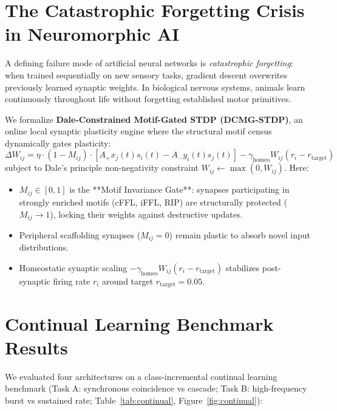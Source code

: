 \documentclass[11pt,letterpaper]{report}
\begin{document}
\section{The Catastrophic Forgetting Crisis in Neuromorphic AI}
A defining failure mode of artificial neural networks is \textit{catastrophic forgetting}: when trained sequentially on new sensory tasks, gradient descent overwrites previously learned synaptic weights. In biological nervous systems, animals learn continuously throughout life without forgetting established motor primitives.

We formalize \textbf{Dale-Constrained Motif-Gated STDP (DCMG-STDP)}, an online local synaptic plasticity engine where the structural motif census dynamically gates plasticity:
\begin{equation}
\Delta W_{ij} = \eta \cdot (1 - M_{ij}) \cdot \left[ A_+ x_j(t) s_i(t) - A_- y_i(t) s_j(t) \right] - \gamma_{\mathrm{homeo}} W_{ij} (r_i - r_{\mathrm{target}})
\end{equation}
subject to Dale's principle non-negativity constraint $W_{ij} \leftarrow \max(0, W_{ij})$. Here:
\begin{itemize}[leftmargin=*]
    \item $M_{ij} \in [0, 1]$ is the **Motif Invariance Gate**: synapses participating in strongly enriched motifs (cFFL, iFFL, RIP) are structurally protected ($M_{ij} \to 1$), locking their weights against destructive updates.
    \item Peripheral scaffolding synapses ($M_{ij} = 0$) remain plastic to absorb novel input distributions.
    \item Homeostatic synaptic scaling $-\gamma_{\mathrm{homeo}} W_{ij} (r_i - r_{\mathrm{target}})$ stabilizes post-synaptic firing rate $r_i$ around target $r_{\mathrm{target}} = 0.05$.
\end{itemize}

\section{Continual Learning Benchmark Results}

We evaluated four architectures on a class-incremental continual learning benchmark (Task A: synchronous coincidence vs cascade; Task B: high-frequency burst vs sustained rate; Table~\ref{tab:continual}, Figure~\ref{fig:continual}):
\end{document}
